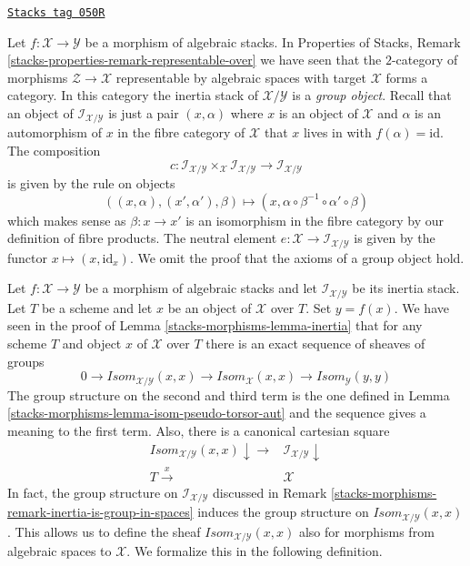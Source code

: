 \begin{remark}
\label{stacks-morphisms-remark-inertia-is-group-in-spaces}
\href{https://stacks.math.columbia.edu/tag/050R}{\texttt{Stacks tag 050R}}

Let $f : \mathcal{X} \to \mathcal{Y}$ be a morphism of algebraic stacks. In
Properties of Stacks, Remark \ref{stacks-properties-remark-representable-over}
we have seen that the $2$-category of morphisms
$\mathcal{Z} \to \mathcal{X}$ representable by algebraic spaces
with target $\mathcal{X}$ forms a category.
In this category the inertia stack of $\mathcal{X}/\mathcal{Y}$ is
a {\it group object}. Recall that an object of
$\mathcal{I}_{\mathcal{X}/\mathcal{Y}}$
is just a pair $(x, \alpha)$ where $x$ is an object of $\mathcal{X}$
and $\alpha$ is an automorphism of $x$ in the fibre category of $\mathcal{X}$
that $x$ lives in with $f(\alpha) = \text{id}$. The composition
$$
c :
\mathcal{I}_{\mathcal{X}/\mathcal{Y}}
\times_\mathcal{X} \mathcal{I}_{\mathcal{X}/\mathcal{Y}}
\longrightarrow
\mathcal{I}_{\mathcal{X}/\mathcal{Y}}
$$
is given by the rule on objects
$$
((x, \alpha), (x', \alpha'), \beta) \mapsto
(x, \alpha \circ \beta^{-1} \circ \alpha' \circ \beta)
$$
which makes sense as $\beta : x \to x'$ is an isomorphism in the fibre
category by our definition of fibre products. The neutral element
$e : \mathcal{X} \to \mathcal{I}_{\mathcal{X}/\mathcal{Y}}$ is given by the
functor $x \mapsto (x, \text{id}_x)$. We omit the proof that the
axioms of a group object hold.
\end{remark}

Let $f : \mathcal{X} \to \mathcal{Y}$ be a morphism of algebraic stacks
and let $\mathcal{I}_{\mathcal{X}/\mathcal{Y}}$ be its inertia stack.
Let $T$ be a scheme and let $x$ be an object of $\mathcal{X}$ over $T$.
Set $y = f(x)$. We have seen in the proof of Lemma \ref{stacks-morphisms-lemma-inertia}
that for any scheme $T$ and object $x$ of $\mathcal{X}$ over $T$
there is an exact sequence of sheaves of groups
\begin{equation}
\label{equation-exact-sequence-isom}
0 \to
\mathit{Isom}_{\mathcal{X}/\mathcal{Y}}(x, x) \to
\mathit{Isom}_\mathcal{X}(x, x) \to
\mathit{Isom}_\mathcal{Y}(y, y)
\end{equation}
The group structure on the second and third term is the one
defined in Lemma \ref{stacks-morphisms-lemma-isom-pseudo-torsor-aut} and the
sequence gives a meaning to the first term. Also, there is
a canonical cartesian square
$$
\begin{array}{cc}\mathit{Isom}_{\mathcal{X}/\mathcal{Y}}(x, x) \downarrow\longrightarrow & \mathcal{I}_{\mathcal{X}/\mathcal{Y}} \downarrow \\ T \overset{x}{\longrightarrow} & \mathcal{X}\end{array}
$$
In fact, the group structure on $\mathcal{I}_{\mathcal{X}/\mathcal{Y}}$
discussed in Remark \ref{stacks-morphisms-remark-inertia-is-group-in-spaces}
induces the group structure on $\mathit{Isom}_{\mathcal{X}/\mathcal{Y}}(x, x)$.
This allows us to define the sheaf
$\mathit{Isom}_{\mathcal{X}/\mathcal{Y}}(x, x)$
also for morphisms from algebraic spaces to $\mathcal{X}$. We formalize
this in the following definition.


